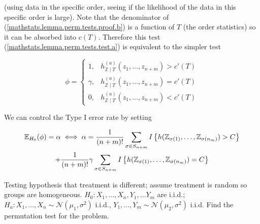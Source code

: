 (using data in the specific order, seeing if the likelihood of the data in this specific order is large). Note that the denominator of (\ref{mathstats.lemma.perm.tests.proof.b}) is a function of \(T\) (the order statistics) so it can be absorbed into \(c(T)\). Therefore this test (\ref{mathstats.lemma.perm.tests.test.a}) is equivalent to the simpler test 

\begin{equation}\label{mathstats.lemma.perm.tests.test.b}
\phi = \begin{cases}
1, &   h_{\mathbb{Z} \mid T} ^{(a)}(z_1, \ldots, z_{n+m}) > c'(T)   \\
\gamma, &  h_{\mathbb{Z} \mid T} ^{(a)}(z_1, \ldots, z_{n+m}) = c' (T) \\
0, &  h_{\mathbb{Z} \mid T} ^{(a)}(z_1, \ldots, z_{n+m}) < c'(T)  
\end{cases}
\end{equation}

We can control the Type I error rate by setting

\begin{multline}\label{mathstats.lemma.perm.tests.const.det.b}
\E_{H_0}(\phi) = \alpha \iff  \alpha = \frac{1}{(n+m)!} \sum_{\sigma \in S_{n+m}} I \left\{  h(\mathbb{Z}_{\sigma(1)}, \ldots, \mathbb{Z}_{\sigma(n_m)}) > C \right\} 
\\ +
\frac{1}{(n+m)!}  \gamma  \sum_{\sigma \in S_{n+m}} I \left\{  h(\mathbb{Z}_{\sigma(1)}, \ldots, \mathbb{Z}_{\sigma(n_m)}) = C \right\} 
\end{multline}


\begin{example}\label{mathstats.perm.tests.ex}

Testing hypothesis that treatment is different; assume treatment is random so groups are homogeneous. \(H_0: X_1, \ldots, X_n, Y_1, \ldots Y_m\) are i.i.d.; \(H_a: X_1, \ldots, X_n \sim \mathcal{N}(\mu_1, \sigma^2)\) i.i.d., \(Y_1, \ldots, Y_m \sim \mathcal{N}(\mu_2, \sigma^2)\) i.i.d. Find the permutation test for the problem.

\end{example}

